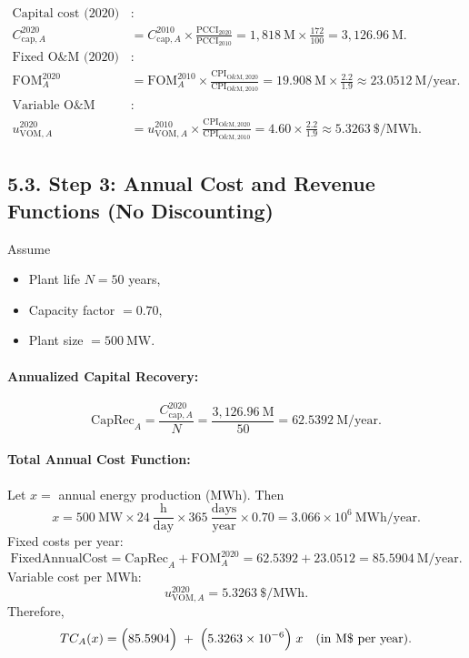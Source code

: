 \documentclass[11pt]{article}
\begin{document}
\begin{align}
  \text{Capital cost (2020)}&: \nonumber\\
  C_{\mathrm{cap},A}^{2020}
  &= C_{\mathrm{cap},A}^{2010}
    \times \frac{\text{PCCI}_{2020}}{\text{PCCI}_{2010}}
  = 1{,}818~\text{M} \times \frac{172}{100}
  = 3{,}126.96~\text{M}.
  \label{eq:inf-cap} \\[1em]
  \text{Fixed O\&M (2020)}&: \nonumber\\
  \mathrm{FOM}_{A}^{2020}
  &= \mathrm{FOM}_{A}^{2010}
    \times \frac{\text{CPI}_{\text{O\&M},2020}}{\text{CPI}_{\text{O\&M},2010}}
  = 19.908~\text{M} \times \frac{2.2}{1.9}
  \approx 23.0512~\text{M/year}.
  \label{eq:inf-fom} \\[1em]
  \text{Variable O\&M (2020)}&: \nonumber\\
  u_{\mathrm{VOM},A}^{2020}
  &= u_{\mathrm{VOM},A}^{2010}
    \times \frac{\text{CPI}_{\text{O\&M},2020}}{\text{CPI}_{\text{O\&M},2010}}
  = 4.60 \times \frac{2.2}{1.9}
  \approx 5.3263~\$/\text{MWh}.
  \label{eq:inf-vom}
\end{align}

\subsection*{5.3. Step 3: Annual Cost and Revenue Functions (No Discounting)}

Assume
\begin{itemize}
  \item Plant life \( N = 50 \) years,
  \item Capacity factor \( = 0.70 \),
  \item Plant size \( = 500~\text{MW} \).
\end{itemize}

\paragraph{Annualized Capital Recovery:}
\[
  \text{CapRec}_{A}
  = \frac{C_{\mathrm{cap},A}^{2020}}{N}
  = \frac{3{,}126.96~\text{M}}{50}
  = 62.5392~\text{M/year}.
  \label{eq:caprec}
\]

\paragraph{Total Annual Cost Function:}
Let \( x = \) annual energy production (MWh). Then
\[
  x = 500~\text{MW} 
      \times 24~\frac{\text{h}}{\text{day}} 
      \times 365~\frac{\text{days}}{\text{year}}
      \times 0.70
  = 3.066 \times 10^{6}~\text{MWh/year}.
  \label{eq:energy}
\]
Fixed costs per year:
\[
  \text{FixedAnnualCost} 
  = \text{CapRec}_{A} + \mathrm{FOM}_{A}^{2020}
  = 62.5392 + 23.0512
  = 85.5904~\text{M/year}.
  \label{eq:fixed-annual}
\]
Variable cost per MWh:
\[
  u_{\mathrm{VOM},A}^{2020} = 5.3263~\$/\text{MWh}.
  \label{eq:var-cost}
\]
Therefore,
\begin{equation}
  TC_A(x) 
  = \Bigl(85.5904\Bigr)\;+\;\Bigl(5.3263 \times 10^{-6}\Bigr)\;x
  \quad\text{(in M\$ per year).}
  \label{eq:annual-cost-func}
\end{equation}
\end{document}
